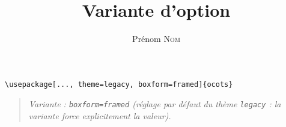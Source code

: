 \documentclass[11pt]{ocots-book}
\title{Variante d'option}
\author{Prénom \textsc{Nom}}
\newcommand{\ocotsvariantnote}[1]{\begin{quote}\itshape Variante : #1\end{quote}}
\begin{document}
\maketitle

\begin{lstlisting}
\usepackage[..., theme=legacy, boxform=framed]{ocots}
\end{lstlisting}
\ocotsvariantnote{\texttt{boxform=framed} (r\'eglage par d\'efaut du th\`eme \texttt{legacy} : la variante force explicitement la valeur).}

\end{document}
